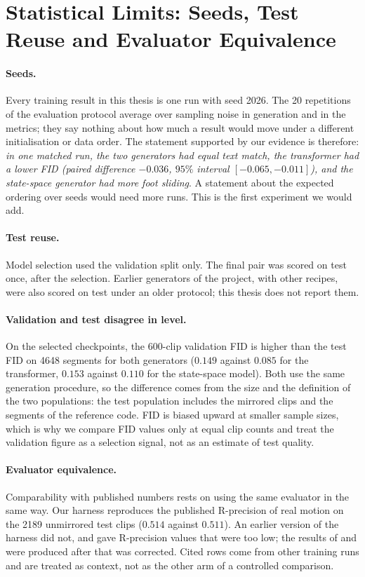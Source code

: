 \section{Statistical Limits: Seeds, Test Reuse and Evaluator Equivalence}
\label{sec:disc_statistics}

\paragraph{Seeds.} Every training result in this thesis is one run with seed 2026. The 20 repetitions of the evaluation protocol average over sampling noise in generation and in the metrics; they say nothing about how much a result would move under a different initialisation or data order. The statement supported by our evidence is therefore: \emph{in one matched run, the two generators had equal text match, the transformer had a lower FID (paired difference $-0.036$, $95\%$ interval $[-0.065, -0.011]$), and the state-space generator had more foot sliding}. A statement about the expected ordering over seeds would need more runs. This is the first experiment we would add.

\paragraph{Test reuse.} Model selection used the validation split only. The final pair was scored on test once, after the selection. Earlier generators of the project, with other recipes, were also scored on test under an older protocol; this thesis does not report them.

\paragraph{Validation and test disagree in level.} On the selected checkpoints, the 600-clip validation FID is higher than the test FID on 4648 segments for both generators ($0.149$ against $0.085$ for the transformer, $0.153$ against $0.110$ for the state-space model). Both use the same generation procedure, so the difference comes from the size and the definition of the two populations: the test population includes the mirrored clips and the segments of the reference code. FID is biased upward at smaller sample sizes, which is why we compare FID values only at equal clip counts and treat the validation figure as a selection signal, not as an estimate of test quality.

\paragraph{Evaluator equivalence.} Comparability with published numbers rests on using the same evaluator in the same way. Our harness reproduces the published R-precision of real motion on the 2189 unmirrored test clips ($0.514$ against $0.511$). An earlier version of the harness did not, and gave R-precision values that were too low; the results of  and  were produced after that was corrected. Cited rows come from other training runs and are treated as context, not as the other arm of a controlled comparison.

